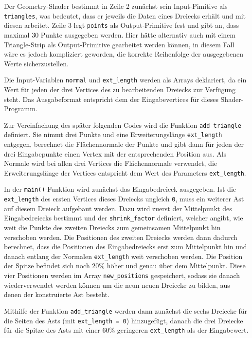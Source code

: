 Der Geometry-Shader bestimmt in Zeile 2 zunächst sein Input-Pimitive als \lstinline{triangles}, was bedeutet, dass er jeweils die Daten eines Dreiecks erhält und mit diesen arbeitet. Zeile 3 legt \lstinline{points} als Output-Primitive fest und gibt an, dass maximal 30 Punkte ausgegeben werden. Hier hätte alternativ auch mit einem Triangle-Strip als Output-Primitive gearbeitet werden können, in diesem Fall wäre es jedoch kompliziert geworden, die korrekte Reihenfolge der ausgegebenen Werte sicherzustellen.

Die Input-Variablen \lstinline{normal} und \lstinline{ext_length} werden als Arrays deklariert, da ein Wert für jeden der drei Vertices des zu bearbeitenden Dreiecks zur Verfügung steht. Das Ausgabeformat entspricht dem der Eingabevertices für dieses Shader-Programm. 

Zur Vereinfachung des später folgenden Codes wird die Funktion \lstinline{add_triangle} definiert. Sie nimmt drei Punkte und eine Erweiterungslänge \lstinline{ext_length} entgegen, berechnet die Flächennormale der Punkte und gibt dann für jeden der drei Eingabepunkte einen Vertex mit der entsprechenden Position aus. Als Normale wird bei allen drei Vertices die Flächennormale verwendet, die Erweiterungslänge der Vertices entspricht dem Wert des Parameters \lstinline{ext_length}.

In der \lstinline{main()}-Funktion wird zunächst das Eingabedreieck ausgegeben. Ist die \lstinline{ext_length} des ersten Vertices dieses Dreiecks ungleich \lstinline{0}, muss ein weiterer Ast auf diesem Dreieck aufgebaut werden. Dazu wird zuerst der Mittelpunkt des Eingabedreiecks bestimmt und der \lstinline{shrink_factor} definiert, welcher angibt, wie weit die Punkte des zweiten Dreiecks zum gemeinsamen Mittelpunkt hin verschoben werden. Die Positionen des zweiten Dreiecks werden dann dadurch berechnet, dass die Positionen des Eingabedreiecks erst zum Mittelpunkt hin und danach entlang der Normalen \lstinline{ext_length} weit verschoben werden. Die Position der Spitze befindet sich noch 20\% höher und genau über dem Mittelpunkt. Diese vier Positionen werden im Array \lstinline{new_positions} gespeichert, sodass sie danach wiederverwendet werden können um die neun neuen Dreiecke zu bilden, aus denen der konstruierte Ast besteht. 

Mithilfe der Funktion \lstinline{add_triangle} werden dann zunächst die sechs Dreiecke für die Seiten des Asts (mit \lstinline{ext_length = 0}) hinzugefügt, danach die drei Dreiecke für die Spitze des Asts mit einer 60\% geringeren \lstinline{ext_length} als der Eingabewert. 

